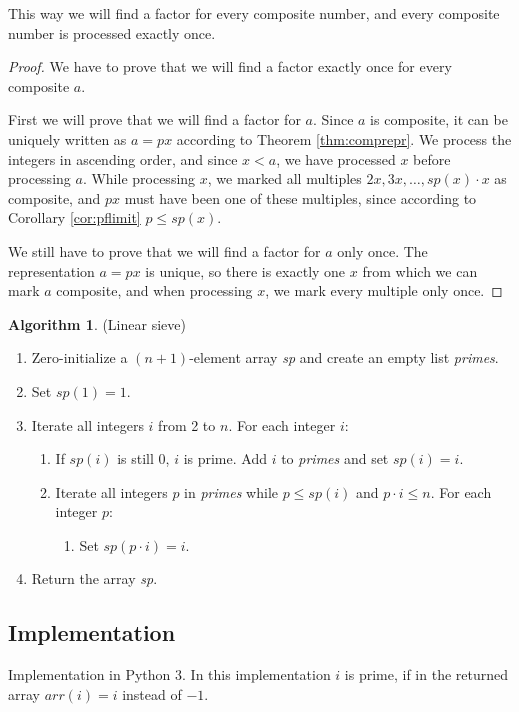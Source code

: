 \documentclass[12pt] {article}
\theoremstyle{plain}
\theoremstyle{definition}
\newtheorem{algo}[thm]{Algorithm}
\begin{document}
This way we will find a factor for every composite number, and every composite number is processed exactly once.

\begin{proof}
We have to prove that we will find a factor exactly once for every composite $a$.

First we will prove that we will find a factor for $a$. Since $a$ is composite, it can be uniquely written as $a = px$ according to Theorem \ref{thm:comprepr}. We process the integers in ascending order, and since $x < a$, we have processed $x$ before processing $a$. While processing $x$, we marked all multiples $2x, 3x, \dots, sp(x) \cdot x$ as composite, and $px$ must have been one of these multiples, since according to Corollary \ref{cor:pflimit} $p \leq sp(x)$.

We still have to prove that we will find a factor for $a$ only once. The representation $a = px$ is unique, so there is exactly one $x$ from which we can mark $a$ composite, and when processing $x$, we mark every multiple only once.
\end{proof}

\begin{algo} (Linear sieve)
\begin{enumerate}
\item Zero-initialize a $(n+1)$-element array \textit{sp} and create an empty list \textit{primes}.
\item Set $sp(1) = 1$.
\item Iterate all integers $i$ from 2 to $n$. For each integer $i$:
\begin{enumerate}
	\item If $sp(i)$ is still 0, $i$ is prime. Add $i$ to \textit{primes} and set $sp(i) = i$.
	\item Iterate all integers $p$ in \textit{primes} while $p \leq sp(i)$ and $p \cdot i \leq n$. For each integer $p$:
\begin{enumerate}
		\item Set $sp(p \cdot i) = i$.
\end{enumerate}
\end{enumerate}
\item Return the array \textit{sp}.
\end{enumerate}
\end{algo}

\subsection {Implementation}

Implementation in Python 3. In this implementation $i$ is prime, if in the returned array $arr(i) = i$ instead of $-1$.



\printbibliography
\end{document}
